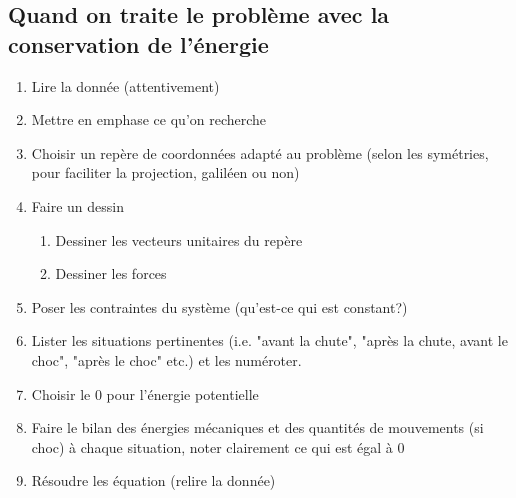 \begin{multicols}{2}
    \subsection{Quand on traite le problème avec la conservation de l'énergie}
    \begin{enumerate}
        \item Lire la donnée (attentivement)
        \item Mettre en emphase ce qu'on recherche
        \item Choisir un repère de coordonnées adapté au problème (selon les symétries, pour faciliter la projection, galiléen   ou non)
        \item Faire un dessin
        \begin{enumerate}
            \item Dessiner les vecteurs unitaires du repère
            \item Dessiner les forces
        \end{enumerate}
        \item Poser les contraintes du système (qu'est-ce qui est constant?)
        \item Lister les situations pertinentes (i.e. "avant la chute", "après la chute, avant le choc", "après le choc" etc.) et les numéroter.
        \item Choisir le $0$ pour l'énergie potentielle
        \item Faire le bilan des énergies mécaniques et des quantités de mouvements (si choc) à chaque situation, noter clairement ce qui est égal à 0
        \item Résoudre les équation (relire la donnée)
    \end{enumerate}
    
\end{multicols}